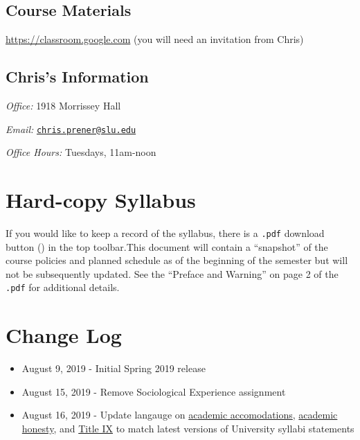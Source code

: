 \documentclass[]{book}
\providecommand{\tightlist}{%
  \setlength{\itemsep}{0pt}\setlength{\parskip}{0pt}}
\begin{document}
\hypertarget{course-materials}{%
\subsection*{Course Materials}\label{course-materials}}

\url{https://classroom.google.com} (you will need an invitation from Chris)

\hypertarget{chriss-information}{%
\subsection*{Chris's Information}\label{chriss-information}}

\emph{Office:} 1918 Morrissey Hall

\emph{Email:} \href{mailto:chris.prener@slu.edu}{\nolinkurl{chris.prener@slu.edu}}

\emph{Office Hours:} Tuesdays, 11am-noon

\hypertarget{hard-copy-syllabus}{%
\section*{Hard-copy Syllabus}\label{hard-copy-syllabus}}

If you would like to keep a record of the syllabus, there is a \texttt{.pdf} download button () in the top toolbar.This document will contain a ``snapshot'' of the course policies and planned schedule as of the beginning of the semester but will not be subsequently updated. See the ``Preface and Warning'' on page 2 of the \texttt{.pdf} for additional details.

\hypertarget{change-log}{%
\section*{Change Log}\label{change-log}}

\begin{itemize}
\tightlist
\item
  August 9, 2019 - Initial Spring 2019 release
\item
  August 15, 2019 - Remove Sociological Experience assignment
\item
  August 16, 2019 - Update langauge on \href{/student-support.html}{academic accomodations}, \href{/academic-honesty.html}{academic honesty}, and \href{/harassment-and-title-ix.html}{Title IX} to match latest versions of University syllabi statements
\end{itemize}
\end{document}
